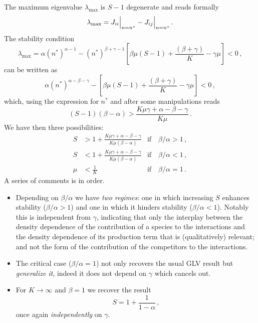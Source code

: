 \documentclass[10pt]{article}
\begin{document}
The maximum eigenvalue $\lambda_{\textrm{max}}$ is $S-1$ degenerate and reads formally
\begin{equation}
    \lambda_{\textrm{max}} = J_{ii}\Big{|}_{n=n^*} - J_{ij}\Big{|}_{n=n^*} \, .
\end{equation}
The stability condition
\begin{equation}
    \lambda_{\textrm{max}} = \alpha (n^*)^{\alpha-1}-(n^*)^{\beta+\gamma-1}\left[\beta \mu(S-1)
    +\frac{(\beta+\gamma)}{K}-\gamma\mu\right]<0 \, ,
\end{equation}
can be written as
\begin{equation}
    \alpha (n^*)^{\alpha-\beta-\gamma}-\left[\beta \mu(S-1)
    +\frac{(\beta+\gamma)}{K}-\gamma\mu\right]<0 \, ,
\end{equation}
which, using the expression for $n^*$ and after some manipulations reads
\begin{equation}
    (S-1)(\beta-\alpha) > \frac{K\mu\gamma+\alpha-\beta-\gamma}{K\mu} \, .
\end{equation}
We have then three possibilities:
\begin{align}
    S &> 1 + \frac{K\mu\gamma+\alpha-\beta-\gamma}{K\mu(\beta-\alpha)} 
    &\textrm{if} \quad \beta/\alpha>1 \, , \\
    S &< 1 + \frac{K\mu\gamma+\alpha-\beta-\gamma}{K\mu(\beta-\alpha)} 
    &\textrm{if} \quad \beta/\alpha<1 \, , \\
    \mu &< \frac{1}{K} &\textrm{if} \quad \beta/\alpha=1 \, .
\end{align}
A series of comments is in order. 
\begin{itemize}
    \item Depending on $\beta/\alpha$ we have \textit{two
    regimes}: one in which increasing $S$ enhances stability ($\beta/\alpha>1$) and 
    one in which it hinders stability ($\beta/\alpha<1$).
    Notably this is independent from $\gamma$, indicating that only the interplay between
    the density dependence of the contribution of a species to the interactions and
    the density dependence of its production term that is (qualitatively) relevant; 
    and not the form of the contribution of the competitors to the interactions.
    \item The critical case ($\beta/\alpha=1$) not only recovers the usual GLV result
    but \textit{generalize it}, indeed it does not depend on $\gamma$ which cancels out.
    \item For $K\to\infty$ and $\beta=1$ we recover the result
    \begin{equation}
        S=1+\frac{1}{1-\alpha} \, ,
    \end{equation}
    once again \textit{independently} on $\gamma$.
\end{itemize}
\end{document}
